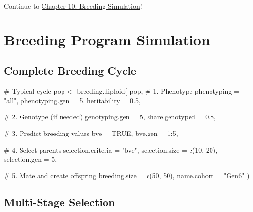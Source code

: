 \documentclass[
  letterpaper,
]{book}
\newenvironment{Shaded}{\begin{snugshade}}{\end{snugshade}}
\newcommand{\AttributeTok}[1]{\textcolor[rgb]{0.40,0.45,0.13}{#1}}
\newcommand{\CommentTok}[1]{\textcolor[rgb]{0.37,0.37,0.37}{#1}}
\newcommand{\ConstantTok}[1]{\textcolor[rgb]{0.56,0.35,0.01}{#1}}
\newcommand{\DecValTok}[1]{\textcolor[rgb]{0.68,0.00,0.00}{#1}}
\newcommand{\FloatTok}[1]{\textcolor[rgb]{0.68,0.00,0.00}{#1}}
\newcommand{\FunctionTok}[1]{\textcolor[rgb]{0.28,0.35,0.67}{#1}}
\newcommand{\NormalTok}[1]{\textcolor[rgb]{0.00,0.23,0.31}{#1}}
\newcommand{\OtherTok}[1]{\textcolor[rgb]{0.00,0.23,0.31}{#1}}
\newcommand{\SpecialCharTok}[1]{\textcolor[rgb]{0.37,0.37,0.37}{#1}}
\newcommand{\StringTok}[1]{\textcolor[rgb]{0.13,0.47,0.30}{#1}}
\begin{document}
Continue to \href{10-breeding-simulation.qmd}{Chapter 10: Breeding
Simulation}!

\chapter{Breeding Program Simulation}\label{sec-breeding-simulation}

\section{Complete Breeding Cycle}\label{complete-breeding-cycle}

\begin{Shaded}
\begin{Highlighting}[]
\CommentTok{\# Typical cycle}
\NormalTok{pop }\OtherTok{\textless{}{-}} \FunctionTok{breeding.diploid}\NormalTok{(}
\NormalTok{  pop,}
  \CommentTok{\# 1. Phenotype}
  \AttributeTok{phenotyping =} \StringTok{"all"}\NormalTok{,}
  \AttributeTok{phenotyping.gen =} \DecValTok{5}\NormalTok{,}
  \AttributeTok{heritability =} \FloatTok{0.5}\NormalTok{,}

  \CommentTok{\# 2. Genotype (if needed)}
  \AttributeTok{genotyping.gen =} \DecValTok{5}\NormalTok{,}
  \AttributeTok{share.genotyped =} \FloatTok{0.8}\NormalTok{,}

  \CommentTok{\# 3. Predict breeding values}
  \AttributeTok{bve =} \ConstantTok{TRUE}\NormalTok{,}
  \AttributeTok{bve.gen =} \DecValTok{1}\SpecialCharTok{:}\DecValTok{5}\NormalTok{,}

  \CommentTok{\# 4. Select parents}
  \AttributeTok{selection.criteria =} \StringTok{"bve"}\NormalTok{,}
  \AttributeTok{selection.size =} \FunctionTok{c}\NormalTok{(}\DecValTok{10}\NormalTok{, }\DecValTok{20}\NormalTok{),}
  \AttributeTok{selection.gen =} \DecValTok{5}\NormalTok{,}

  \CommentTok{\# 5. Mate and create offspring}
  \AttributeTok{breeding.size =} \FunctionTok{c}\NormalTok{(}\DecValTok{50}\NormalTok{, }\DecValTok{50}\NormalTok{),}
  \AttributeTok{name.cohort =} \StringTok{"Gen6"}
\NormalTok{)}
\end{Highlighting}
\end{Shaded}

\section{Multi-Stage Selection}\label{multi-stage-selection}
\end{document}
